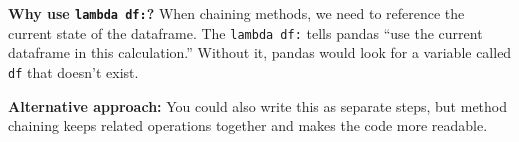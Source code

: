\documentclass[
  letterpaper,
  DIV=11,
  numbers=noendperiod]{scrartcl}
\begin{document}
\begin{tcolorbox}[enhanced jigsaw, bottomtitle=1mm, opacitybacktitle=0.6, toptitle=1mm, colbacktitle=quarto-callout-tip-color!10!white, breakable, coltitle=black, bottomrule=.15mm, left=2mm, colframe=quarto-callout-tip-color-frame, colback=white, title=\textcolor{quarto-callout-tip-color}{\faLightbulb}\hspace{0.5em}{💡 Method Chaining Tip for New Python Users}, leftrule=.75mm, arc=.35mm, rightrule=.15mm, opacityback=0, toprule=.15mm, titlerule=0mm]

\textbf{Why use \texttt{lambda\ df:}?} When chaining methods, we need to
reference the current state of the dataframe. The \texttt{lambda\ df:}
tells pandas ``use the current dataframe in this calculation.'' Without
it, pandas would look for a variable called \texttt{df} that doesn't
exist.

\textbf{Alternative approach:} You could also write this as separate
steps, but method chaining keeps related operations together and makes
the code more readable.

\end{tcolorbox}
\end{document}
